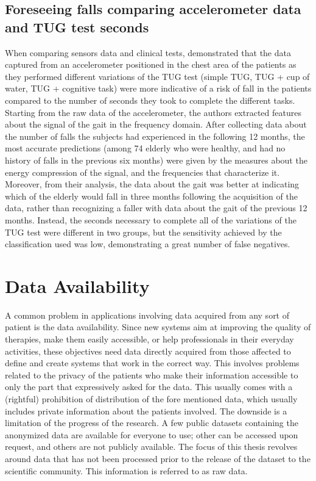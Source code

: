 \subsection{Foreseeing falls comparing accelerometer data and TUG test seconds}
When comparing sensors data and clinical tests, \cite{ForesseingACCTUG} demonstrated that the data captured from an accelerometer positioned in the chest area of the patients as they performed different variations of the TUG test (simple TUG, TUG + cup of water, TUG + cognitive task) were more indicative of a risk of fall in the patients compared to the number of seconds they took to complete the different tasks.
Starting from the raw data of the accelerometer, the authors extracted features about the signal of the gait in the frequency domain.
After collecting data about the number of falls the subjects had experienced in the following 12 months, the most accurate predictions (among 74 elderly who were healthy, and had no history of falls in the previous six months) were given by the measures about the energy compression of the signal, and the frequencies that characterize it. 
Moreover, from their analysis, the data about the gait was better at indicating which of the elderly would fall in three months following the acquisition of the data, rather than recognizing a faller with data about the gait of the previous 12 months. 
Instead, the seconds necessary to complete all of the variations of the TUG test were different in two groups, but the sensitivity achieved by the classification used was low, demonstrating a great number of false negatives.


\section{Data Availability}
A common problem in applications involving data acquired from any sort of patient is the data availability. Since new systems aim at improving the quality of therapies, make them easily accessible, or help professionals in their everyday activities, these objectives need data directly acquired from those affected to define and create systems that work in the correct way. This involves problems related to the privacy of the patients who make their information accessible to only the part that expressively asked for the data. This usually comes with a (rightful) prohibition of distribution of the fore mentioned data, which usually includes private information about the patients involved. The downside is a limitation of the progress of the research. 
A few public datasets containing the anonymized data are available for everyone to use; other can be accessed upon request, and others are not publicly available. The focus of this thesis revolves around data that has not been processed prior to the release of the dataset to the scientific community. This information is referred to as raw data.



